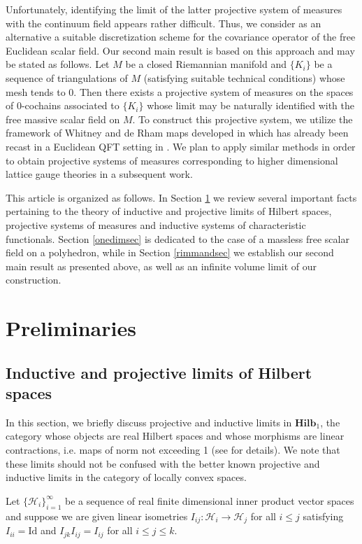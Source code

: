 \documentclass[11pt,reqno]{amsart}
\numberwithin{equation}{section}
\theoremstyle{remark}
\theoremstyle{rmdefinition}
\begin{document}
Unfortunately, identifying the limit of the latter projective system of measures with the continuum field appears rather difficult. Thus, we consider as an alternative a suitable discretization scheme for the covariance operator of the free Euclidean scalar field. Our second main result is based on this approach and may be stated as follows. Let $M$ be a closed Riemannian manifold and $\{K_{i}\}$ be a sequence of triangulations of $M$ (satisfying suitable technical conditions) whose mesh tends to 0. Then there exists a projective system of measures on the spaces of 0-cochains associated to $\{K_{i}\}$ whose limit may be naturally identified with the free massive scalar field on $M$. To construct this projective system, we utilize the framework of Whitney and de Rham maps developed in \cite{Do} which has already been recast in a Euclidean QFT setting in \cite{AZ}. We plan to apply similar methods in order to obtain projective systems of measures corresponding to higher dimensional lattice gauge theories in a subsequent work.

This article is organized as follows. In Section \ref{prelsec} we review several important facts pertaining to the theory of inductive and projective limits of Hilbert spaces, projective systems of measures and inductive systems of characteristic functionals. Section \ref{onedimsec} is dedicated to the case of a massless free scalar field on a polyhedron, while in Section \ref{rimmandsec} we establish our second main result as presented above, as well as an infinite volume limit of our construction.

\section{Preliminaries}\label{prelsec}
\subsection{Inductive and projective limits of Hilbert spaces}\label{indprojsubse}
In this section, we briefly discuss projective and inductive limits in $\mathbf{Hilb}_1$, the category whose objects are real Hilbert spaces and whose morphisms are linear contractions, i.e. maps of norm not exceeding 1 (see \cite[Section 2]{Gr} for details). We note that these limits should not be confused with the better known projective and inductive limits in the category of locally convex spaces.

Let $\{\mathcal{H}_i\}_{i=1}^{\infty}$ be a sequence of real finite dimensional inner product vector spaces and suppose we are given linear isometries $I_{ij}: \mathcal{H}_i \rightarrow \mathcal{H}_j$ for all $i\leq j$ satisfying $I_{ii}=\text{Id}$ and $I_{jk} I_{ij}=I_{ij}$ for all $i \leq j \leq k $.
\end{document}
